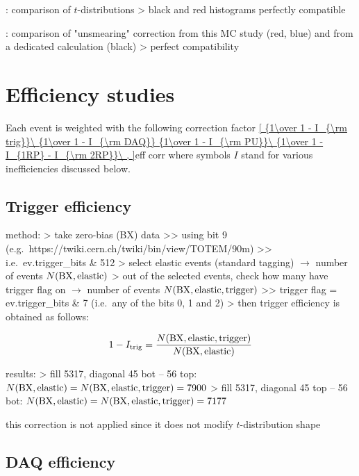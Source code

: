 \>  : comparison of $t$-distributions
\>> black and red histograms perfectly compatible

\>  : comparison of "unsmearing" correction from this MC study (red, blue) and from a dedicated calculation (black)
\>> perfect compatibility



\chapter[efficiency]{Efficiency studies}

\vskip3mm
Each event is weighted with the following correction factor
\eqref{
	{1\over 1 - I_{\rm trig}}\ 
	{1\over 1 - I_{\rm DAQ}}
	{1\over 1 - I_{\rm PU}}\ 
	{1\over 1 - I_{1RP} - I_{\rm 2RP}}\ ,
}{eff corr}
where symbols $I$ stand for various inefficiencies discussed below.

\section[efficiency-trigger]{Trigger efficiency}

\> method:
\>> take zero-bias (BX) data
\>>> using bit 9 (e.g.~https://twiki.cern.ch/twiki/bin/view/TOTEM/90m)
\>>> i.e.~ev.trigger\_bits \& 512
\>> select elastic events (standard tagging) $\rightarrow$ number of events $N({\rm BX,elastic})$
\>> out of the selected events, check how many have trigger flag on $\rightarrow$ number of events $N({\rm BX,elastic,trigger})$
\>>> trigger flag = ev.trigger\_bits \& 7 (i.e.~any of the bits 0, 1 and 2)
\>> then trigger efficiency is obtained as follows:

$$1 - I_{\rm trig} = {N({\rm BX,elastic,trigger}) \over N({\rm BX,elastic})}$$

\> results:
\>> fill 5317, diagonal 45 bot -- 56 top: $N({\rm BX,elastic}) = N({\rm BX,elastic,trigger}) = 7900$
\>> fill 5317, diagonal 45 top -- 56 bot: $N({\rm BX,elastic}) = N({\rm BX,elastic,trigger}) = 7177$

\> this correction is not applied since it does not modify $t$-distribution shape


\section[efficiency-trigger]{DAQ efficiency}

